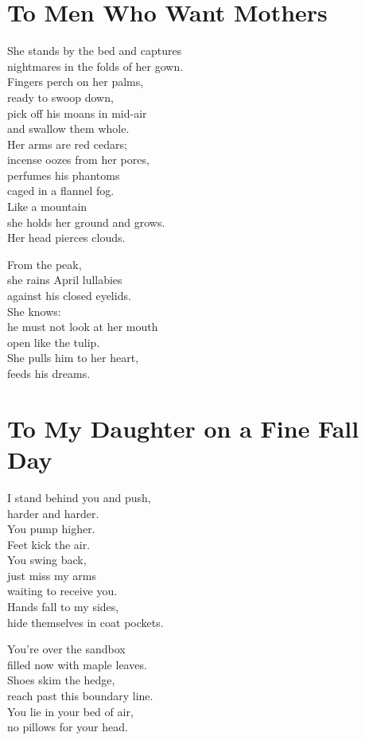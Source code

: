 \documentclass[twoside,10pt]{book}
\begin{document}
\clearpage
\section{To Men Who Want Mothers}

She stands by the bed and captures\\
nightmares in the folds of her gown.\\
Fingers perch on her palms,\\
ready to swoop down,\\
pick off his moans in mid-air\\
and swallow them whole.\\
Her arms are red cedars;\\
incense oozes from her pores,\\
perfumes his phantoms\\
caged in a flannel fog.\\
Like a mountain\\
she holds her ground and grows.\\
Her head pierces clouds.

From the peak,\\
she rains April lullabies\\
against his closed eyelids.\\
She knows:\\
he must not look at her mouth\\
open like the tulip.\\
She pulls him to her heart,\\
feeds his dreams.


\clearpage
\section{To My Daughter on a Fine Fall Day}

I stand behind you and push,\\
harder and harder.\\
You pump higher.\\
Feet kick the air.\\
You swing back,\\
just miss my arms\\
waiting to receive you.\\
Hands fall to my sides,\\
hide themselves in coat pockets.

You're over the sandbox\\
filled now with maple leaves.\\
Shoes skim the hedge,\\
reach past this boundary line.\\
You lie in your bed of air,\\
no pillows for your head.
\end{document}
